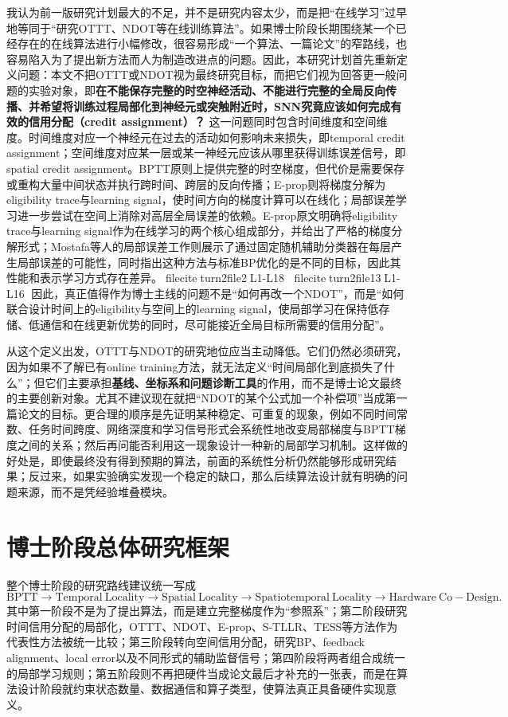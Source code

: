 \documentclass[journal,12pt,onecolumn]{IEEEtran}
\begin{document}
我认为前一版研究计划最大的不足，并不是研究内容太少，而是把“在线学习”过早地等同于“研究OTTT、NDOT等在线训练算法”。如果博士阶段长期围绕某一个已经存在的在线算法进行小幅修改，很容易形成“一个算法、一篇论文”的窄路线，也容易陷入为了提出新方法而人为制造改进点的问题。因此，本研究计划首先重新定义问题：本文不把OTTT或NDOT视为最终研究目标，而把它们视为回答更一般问题的实验对象，即\textbf{在不能保存完整的时空神经活动、不能进行完整的全局反向传播、并希望将训练过程局部化到神经元或突触附近时，SNN究竟应该如何完成有效的信用分配（credit assignment）？} 这一问题同时包含时间维度和空间维度。时间维度对应一个神经元在过去的活动如何影响未来损失，即temporal credit assignment；空间维度对应某一层或某一神经元应该从哪里获得训练误差信号，即spatial credit assignment。BPTT原则上提供完整的时空梯度，但代价是需要保存或重构大量中间状态并执行跨时间、跨层的反向传播；E-prop则将梯度分解为eligibility trace与learning signal，使时间方向的梯度计算可以在线化；局部误差学习进一步尝试在空间上消除对高层全局误差的依赖。E-prop原文明确将eligibility trace与learning signal作为在线学习的两个核心组成部分，并给出了严格的梯度分解形式\cite{bellec_solution_2020}；Mostafa等人的局部误差工作则展示了通过固定随机辅助分类器在每层产生局部误差的可能性，同时指出这种方法与标准BP优化的是不同的目标，因此其性能和表示学习方式存在差异。fileciteturn2file2L1-L18 fileciteturn2file13L1-L16 因此，真正值得作为博士主线的问题不是“如何再改一个NDOT”，而是“如何联合设计时间上的eligibility与空间上的learning signal，使局部学习在保持低存储、低通信和在线更新优势的同时，尽可能接近全局目标所需要的信用分配”。

从这个定义出发，OTTT与NDOT的研究地位应当主动降低。它们仍然必须研究，因为如果不了解已有online training方法，就无法定义“时间局部化到底损失了什么”；但它们主要承担\textbf{基线、坐标系和问题诊断工具}的作用，而不是博士论文最终的主要创新对象。尤其不建议现在就把“NDOT的某个公式加一个补偿项”当成第一篇论文的目标。更合理的顺序是先证明某种稳定、可重复的现象，例如不同时间常数、任务时间跨度、网络深度和学习信号形式会系统性地改变局部梯度与BPTT梯度之间的关系；然后再问能否利用这一现象设计一种新的局部学习机制。这样做的好处是，即使最终没有得到预期的算法，前面的系统性分析仍然能够形成研究结果；反过来，如果实验确实发现一个稳定的缺口，那么后续算法设计就有明确的问题来源，而不是凭经验堆叠模块。

\section{博士阶段总体研究框架}

整个博士阶段的研究路线建议统一写成
\begin{equation}
\boxed{
\mathrm{BPTT}
\rightarrow
\mathrm{Temporal\ Locality}
\rightarrow
\mathrm{Spatial\ Locality}
\rightarrow
\mathrm{Spatiotemporal\ Locality}
\rightarrow
\mathrm{Hardware\ Co\!-\!Design}
}.
\end{equation}
其中第一阶段不是为了提出算法，而是建立完整梯度作为“参照系”；第二阶段研究时间信用分配的局部化，OTTT、NDOT、E-prop、S-TLLR、TESS等方法作为代表性方法被统一比较；第三阶段转向空间信用分配，研究BP、feedback alignment、local error以及不同形式的辅助监督信号；第四阶段将两者组合成统一的局部学习规则；第五阶段则不再把硬件当成论文最后才补充的一张表，而是在算法设计阶段就约束状态数量、数据通信和算子类型，使算法真正具备硬件实现意义。
\end{document}
